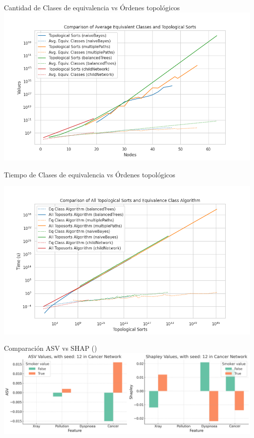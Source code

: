 \begin{frame}{Cantidad de Clases de equivalencia vs \'Ordenes topol\'ogicos}
	\centering
	\includegraphics[width=0.95\linewidth]{pic/img/equivalentClassesVsToposorts.png}
\end{frame}

\begin{frame}{Tiempo de Clases de equivalencia vs \'Ordenes topol\'ogicos}
	
	\centering
	\includegraphics[width=\linewidth]{pic/img/equivalentClassesVsAllToposorts_time.png}
	
\end{frame}

\begin{frame}{Comparaci\'on ASV vs SHAP (\cancerNetwork)}
	\centering
	\includegraphics[width=1\linewidth]{pic/img/asvResults/cancerASVAndShapleyExactASVAndShapley.png}

\end{frame}

